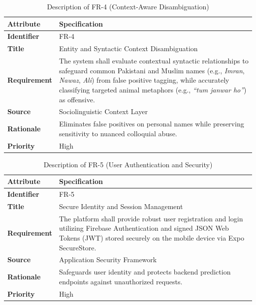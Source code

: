 \documentclass[A4paper,12pt]{report}
\theoremstyle{plain}
\theoremstyle{definition}
\theoremstyle{remark}
\numberwithin{equation}{section}
\begin{document}
\begin{table}[H]
\centering
\caption{Description of FR-4 (Context-Aware Disambiguation)}
\renewcommand{\arraystretch}{1.3}
\begin{tabular}{|p{3.5cm}|p{10.5cm}|}
\hline
\textbf{Attribute} & \textbf{Specification} \\ \hline
\textbf{Identifier} & FR-4 \\ \hline
\textbf{Title} & Entity and Syntactic Context Disambiguation \\ \hline
\textbf{Requirement} & The system shall evaluate contextual syntactic relationships to safeguard common Pakistani and Muslim names (e.g., \textit{Imran}, \textit{Nawaz}, \textit{Ali}) from false positive tagging, while accurately classifying targeted animal metaphors (e.g., \textit{``tum janwar ho''}) as offensive. \\ \hline
\textbf{Source} & Sociolinguistic Context Layer \\ \hline
\textbf{Rationale} & Eliminates false positives on personal names while preserving sensitivity to nuanced colloquial abuse. \\ \hline
\textbf{Priority} & High \\ \hline
\end{tabular}
\end{table}

\begin{table}[H]
\centering
\caption{Description of FR-5 (User Authentication and Security)}
\renewcommand{\arraystretch}{1.3}
\begin{tabular}{|p{3.5cm}|p{10.5cm}|}
\hline
\textbf{Attribute} & \textbf{Specification} \\ \hline
\textbf{Identifier} & FR-5 \\ \hline
\textbf{Title} & Secure Identity and Session Management \\ \hline
\textbf{Requirement} & The platform shall provide robust user registration and login utilizing Firebase Authentication and signed JSON Web Tokens (JWT) stored securely on the mobile device via Expo SecureStore. \\ \hline
\textbf{Source} & Application Security Framework \\ \hline
\textbf{Rationale} & Safeguards user identity and protects backend prediction endpoints against unauthorized requests. \\ \hline
\textbf{Priority} & High \\ \hline
\end{tabular}
\end{table}
\end{document}
